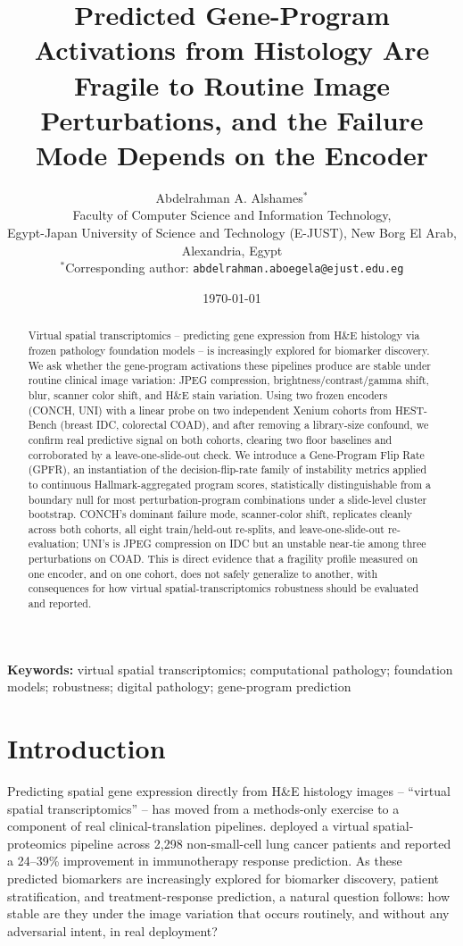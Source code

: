 \documentclass[11pt]{article}
\title{Predicted Gene-Program Activations from Histology Are Fragile to Routine Image Perturbations, and the Failure Mode Depends on the Encoder}
\author{Abdelrahman A. Alshames$^{*}$\\[4pt]
\small Faculty of Computer Science and Information Technology,\\
\small Egypt-Japan University of Science and Technology (E-JUST), New Borg El Arab, Alexandria, Egypt\\[4pt]
\small $^{*}$Corresponding author: \texttt{abdelrahman.aboegela@ejust.edu.eg}}
\date{\today}
\begin{document}
\maketitle

\begin{abstract}
Virtual spatial transcriptomics -- predicting gene expression from H\&E histology via frozen pathology foundation models -- is increasingly explored for biomarker discovery. We ask whether the gene-program activations these pipelines produce are stable under routine clinical image variation: JPEG compression, brightness/contrast/gamma shift, blur, scanner color shift, and H\&E stain variation. Using two frozen encoders (CONCH, UNI) with a linear probe on two independent Xenium cohorts from HEST-Bench (breast IDC, colorectal COAD), and after removing a library-size confound, we confirm real predictive signal on both cohorts, clearing two floor baselines and corroborated by a leave-one-slide-out check. We introduce a Gene-Program Flip Rate (GPFR), an instantiation of the decision-flip-rate family of instability metrics applied to continuous Hallmark-aggregated program scores, statistically distinguishable from a boundary null for most perturbation-program combinations under a slide-level cluster bootstrap. CONCH's dominant failure mode, scanner-color shift, replicates cleanly across both cohorts, all eight train/held-out re-splits, and leave-one-slide-out re-evaluation; UNI's is JPEG compression on IDC but an unstable near-tie among three perturbations on COAD. This is direct evidence that a fragility profile measured on one encoder, and on one cohort, does not safely generalize to another, with consequences for how virtual spatial-transcriptomics robustness should be evaluated and reported.
\end{abstract}

\noindent\textbf{Keywords:} virtual spatial transcriptomics; computational pathology; foundation models; robustness; digital pathology; gene-program prediction

\section{Introduction}

Predicting spatial gene expression directly from H\&E histology images -- ``virtual spatial transcriptomics'' -- has moved from a methods-only exercise to a component of real clinical-translation pipelines. \citet{nature_medicine_2025_virtual_st} deployed a virtual spatial-proteomics pipeline across 2{,}298 non-small-cell lung cancer patients and reported a 24--39\% improvement in immunotherapy response prediction. As these predicted biomarkers are increasingly explored for biomarker discovery, patient stratification, and treatment-response prediction, a natural question follows: how stable are they under the image variation that occurs routinely, and without any adversarial intent, in real deployment?
\end{document}
